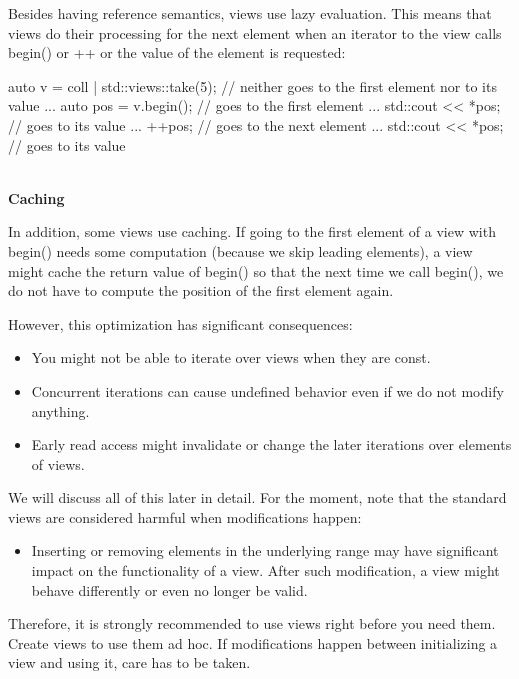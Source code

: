 Besides having reference semantics, views use lazy evaluation. This means that views do their processing for the next element when an iterator to the view calls begin() or ++ or the value of the element is requested:

\begin{cpp}
auto v = coll | std::views::take(5); // neither goes to the first element nor to its value
...
auto pos = v.begin(); // goes to the first element
...
std::cout << *pos; // goes to its value
...
++pos; // goes to the next element
...
std::cout << *pos; // goes to its value
\end{cpp}

\noindent
\hspace*{\fill} \\ %
\textbf{Caching}

In addition, some views use caching. If going to the first element of a view with begin() needs some computation (because we skip leading elements), a view might cache the return value of begin() so that the next time we call begin(), we do not have to compute the position of the first element again.

However, this optimization has significant consequences:

\begin{itemize}
\item
You might not be able to iterate over views when they are const.

\item
Concurrent iterations can cause undefined behavior even if we do not modify anything.

\item
Early read access might invalidate or change the later iterations over elements of views.
\end{itemize}

We will discuss all of this later in detail. For the moment, note that the standard views are considered harmful when modifications happen:

\begin{itemize}
\item
Inserting or removing elements in the underlying range may have significant impact on the functionality of a view. After such modification, a view might behave differently or even no longer be valid.
\end{itemize}

Therefore, it is strongly recommended to use views right before you need them. Create views to use them ad hoc. If modifications happen between initializing a view and using it, care has to be taken.

